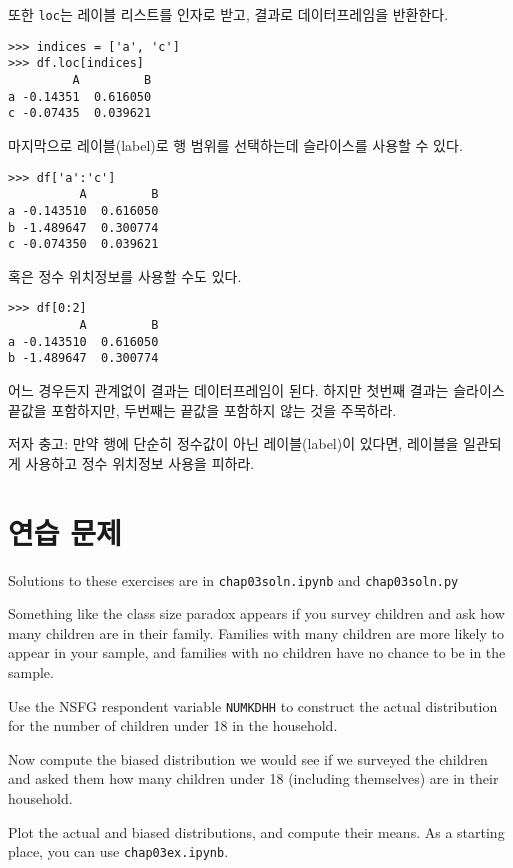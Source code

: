 또한 {\tt loc}는 레이블 리스트를 인자로 받고, 결과로 데이터프레임을 반환한다.

\begin{verbatim}
>>> indices = ['a', 'c']
>>> df.loc[indices]
         A         B
a -0.14351  0.616050
c -0.07435  0.039621
\end{verbatim}

마지막으로 레이블(label)로 행 범위를 선택하는데 슬라이스를 사용할 수 있다.

\begin{verbatim}
>>> df['a':'c']
          A         B
a -0.143510  0.616050
b -1.489647  0.300774
c -0.074350  0.039621
\end{verbatim}

혹은 정수 위치정보를 사용할 수도 있다.

\begin{verbatim}
>>> df[0:2]
          A         B
a -0.143510  0.616050
b -1.489647  0.300774
\end{verbatim}

어느 경우든지 관계없이 결과는 데이터프레임이 된다. 하지만 첫번째 결과는 슬라이스 끝값을 포함하지만, 두번째는 끝값을 포함하지 않는 것을 주목하라.

저자 충고: 만약 행에 단순히 정수값이 아닌 레이블(label)이 있다면, 레이블을 일관되게 사용하고 정수 위치정보 사용을 피하라.


\section{연습 문제}

Solutions to these exercises are in \verb"chap03soln.ipynb"
and \verb"chap03soln.py"

\begin{exercise}
Something like the class size paradox appears if you survey children
and ask how many children are in their family.  Families with many
children are more likely to appear in your sample, and
families with no children have no chance to be in the sample.

Use the NSFG respondent variable \verb"NUMKDHH" to construct the actual
distribution for the number of children under 18 in the household.

Now compute the biased distribution we would see if we surveyed the
children and asked them how many children under 18 (including themselves)
are in their household.  

Plot the actual and biased distributions, and compute their means.
As a starting place, you can use \verb"chap03ex.ipynb".
\end{exercise}


